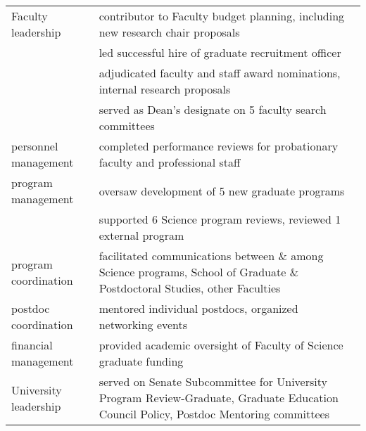\begin{tabularx}{\textwidth}{lX}
Faculty leadership & contributor to Faculty  budget planning,  including new research chair proposals \\
& led successful hire of graduate recruitment officer \\
& adjudicated faculty and staff award nominations, internal research proposals  \\
& served as Dean's designate on 5 faculty search committees \\
personnel management & completed performance reviews for probationary faculty and professional staff  \\
program management  & oversaw development of 5 new graduate programs \\
& supported 6 Science program reviews, reviewed 1 external program \\
program coordination & facilitated communications between \& among Science programs, School of Graduate \& Postdoctoral Studies, other Faculties \\
postdoc coordination & mentored individual postdocs, organized networking events  \\ 
financial management & provided academic oversight of Faculty of Science graduate funding  \\
University leadership &  served on Senate Subcommittee for University Program Review-Graduate, Graduate Education Council Policy, Postdoc Mentoring committees  \\

\end{tabularx}


